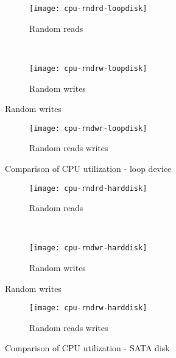 \begin{figure}[!ht]
  \begin{subfigure}[b]{\textwidth}
  \texttt{[image: cpu-rndrd-loopdisk]}
  \caption{Random reads}
  \label{subfig:cpu-rndrd-loopdisk}
  \end{subfigure}\\
  \begin{subfigure}[b]{\textwidth}
  \texttt{[image: cpu-rndrw-loopdisk]}
  \caption{Random writes}
  \label{subfig:cpu-rndrw-loopdisk}
\end{subfigure}
\end{figure}

\begin{figure}[H]
  \ContinuedFloat  \begin{subfigure}[b]{\textwidth}
  \texttt{[image: cpu-rndwr-loopdisk]}
  \caption{Random reads writes}
  \label{subfig:cpu-rndwr-loopdisk}
  \end{subfigure}
\caption{Comparison of CPU utilization - loop device}\label{fig:cpuloopdisk}
\end{figure}

\begin{figure}[!ht]
\centering
  \begin{subfigure}[b]{\textwidth}
  \texttt{[image: cpu-rndrd-harddisk]}
  \caption{Random reads}
  \label{subfig:cpu-rndrd-harddisk}
  \end{subfigure}\\
  \begin{subfigure}[b]{\textwidth}
  \texttt{[image: cpu-rndwr-harddisk]}
  \caption{Random writes}
  \label{subfig:cpu-rndwr-harddisk}
  \end{subfigure}
\end{figure}

\begin{figure}[H]
  \ContinuedFloat
  \begin{subfigure}[b]{\textwidth}
  \texttt{[image: cpu-rndrw-harddisk]}
  \caption{Random reads writes}
  \label{subfig:cpurndrw-harddisk}
  \end{subfigure}
\caption{Comparison of CPU utilization - SATA disk}\label{fig:cpuharddisk}
\end{figure}